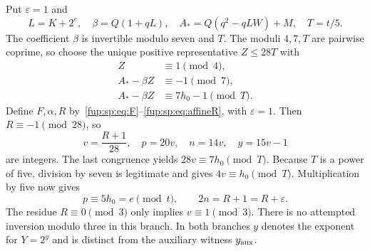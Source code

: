 \documentclass[11pt,letterpaper]{article}
\theoremstyle{definition}\newtheorem{definition}[theorem]{Definition}
\theoremstyle{remark}\newtheorem{remark}[theorem]{Remark}
\begin{document}
Put $\varepsilon=1$ and
\begin{equation}
L=K+2^e,\quad\beta=Q(1+qL),\quad
A_*=Q(q^2-qLW)+M,\quad T=t/5.
\label{fup:sp:eq:AstarB}
\end{equation}
The coefficient $\beta$ is invertible modulo seven and $T$.
The moduli $4,7,T$ are pairwise coprime, so choose the unique positive
representative $Z\le28T$ with
\begin{equation}
\begin{split}
Z&\equiv1\pmod4,\\
A_*-\beta Z&\equiv-1\pmod7,\\
A_*-\beta Z&\equiv7h_0-1\pmod T.
\end{split}
\label{fup:sp:eq:crtB}
\end{equation}
Define $F,\alpha,R$ by~\eqref{fup:sp:eq:F}--\eqref{fup:sp:eq:affineR}, with
$\varepsilon=1$. Then $R\equiv-1\pmod{28}$, so
\begin{equation}
v=\frac{R+1}{28},\quad p=20v,\quad n=14v,\quad y=15v-1
\label{fup:sp:eq:familyB}
\end{equation}
are integers. The last congruence yields $28v\equiv7h_0\pmod T$.
Because $T$ is a power of five, division by seven is legitimate and
gives $4v\equiv h_0\pmod T$. Multiplication by five now gives
\begin{equation}
p\equiv5h_0=e\pmod t,\qquad 2n=R+1=R+\varepsilon.
\label{fup:sp:eq:coupleB}
\end{equation}
The residue $R\equiv0\pmod3$ only implies $v\equiv1\pmod3$.
There is no attempted inversion modulo three in this branch.
In both branches $y$ denotes the exponent for $Y=2^y$ and is
distinct from the auxiliary witness $y_{\mathrm{aux}}$.
\end{document}
